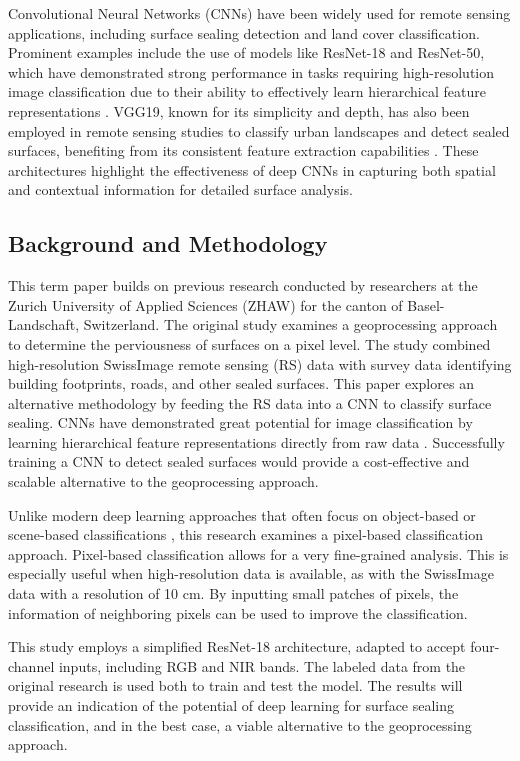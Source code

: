 Convolutional Neural Networks (CNNs) have been widely used for remote sensing applications, 
including surface sealing detection and land cover classification. 
Prominent examples include the use of models like ResNet-18 and ResNet-50, which have demonstrated strong performance 
in tasks requiring high-resolution image classification due to their ability to effectively 
learn hierarchical feature representations \autocite{natyaDeepTransferLearning2022}. 
VGG19, known for its simplicity and depth, has also been employed in remote sensing studies
to classify urban landscapes and detect sealed surfaces, benefiting from its consistent 
feature extraction capabilities \autocite{alemTransferLearningModels2022}. 
These architectures highlight the effectiveness of deep CNNs in 
capturing both spatial and contextual information for detailed surface analysis.

\subsection{Background and Methodology}

This term paper builds on previous research conducted by researchers at the
Zurich University of Applied Sciences (ZHAW) for the canton of Basel-Landschaft, 
Switzerland. The original study examines a geoprocessing approach to determine the 
perviousness of surfaces on a pixel level. The study combined high-resolution SwissImage
remote sensing (RS) data with survey data identifying building footprints, roads, and other sealed surfaces.
This paper explores an alternative methodology by feeding the RS data into a CNN
to classify surface sealing. CNNs have demonstrated great potential for image
classification by learning hierarchical feature representations directly from raw data \autocite{zhaoReviewConvolutionalNeural2024}.
Successfully training a CNN to detect sealed surfaces would provide a cost-effective
and scalable alternative to the geoprocessing approach.

Unlike modern deep learning approaches that often focus on object-based or scene-based 
classifications \autocite{thapaDeepLearningRemote2023}, this research examines a 
pixel-based classification approach. Pixel-based classification allows for a
very fine-grained analysis. This is especially useful when high-resolution data is
available, as with the SwissImage data with a resolution of 10 cm. By inputting small
patches of pixels, the information of neighboring pixels can be used to improve the
classification.

This study employs a simplified ResNet-18 architecture, adapted to accept four-channel
inputs, including RGB and NIR bands. The labeled data from the original research
is used both to train and test the model. The results will provide an indication
of the potential of deep learning for surface sealing classification, and in
the best case, a viable alternative to the geoprocessing approach.

